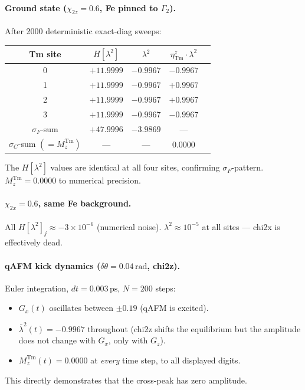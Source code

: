 \documentclass[11pt,a4paper]{article}
\newcommand{\sF}{\sigma_F}
\newcommand{\sC}{\sigma_C}
\newcommand{\etaz}{\eta^z}
\newcommand{\Mz}{M_z^{\mathrm{Tm}}}
\newcommand{\lamt}{\lambda^2}
\newcommand{\Gtwo}{\Gamma_2}
\begin{document}
\paragraph{Ground state ($\chi_{2z}=0.6$, Fe pinned to $\Gtwo$).}
After 2000 deterministic exact-diag sweeps:
\begin{center}
\begin{tabular}{ccccc}
\toprule
Tm site & $H[\lamt]$ & $\lamt$ & $\etaz_{\mathrm{Tm}}\cdot\lamt$ \\
\midrule
0 & $+11.9999$ & $-0.9967$ & $-0.9967$ \\
1 & $+11.9999$ & $-0.9967$ & $+0.9967$ \\
2 & $+11.9999$ & $-0.9967$ & $+0.9967$ \\
3 & $+11.9999$ & $-0.9967$ & $-0.9967$ \\
\midrule
$\sF$-sum & $+47.9996$ & $-3.9869$ & --- \\
$\sC$-sum $(=\Mz)$ & --- & --- & $\mathbf{0.0000}$ \\
\bottomrule
\end{tabular}
\end{center}
The $H[\lamt]$ values are identical at all four sites, confirming $\sF$-pattern.
$\Mz = 0.0000$ to numerical precision.

\paragraph{$\chi_{2x}=0.6$, same Fe background.}
All $H[\lamt]_j \approx -3\times 10^{-6}$ (numerical noise).
$\lamt \approx 10^{-5}$ at all sites — chi2x is effectively dead.

\paragraph{qAFM kick dynamics ($\delta\theta = 0.04\,\mathrm{rad}$, chi2z).}
Euler integration, $dt = 0.003\,\mathrm{ps}$, $N=200$ steps:
\begin{itemize}
  \item $G_x(t)$ oscillates between $\pm 0.19$ (qAFM is excited).
  \item $\bar\lambda^2(t) = -0.9967$ throughout (chi2z shifts the equilibrium but
    the amplitude does not change with $G_x$, only with $G_z$).
  \item $\Mz(t) = 0.0000$ at \emph{every} time step, to all displayed digits.
\end{itemize}
This directly demonstrates that the cross-peak has zero amplitude.
\end{document}
